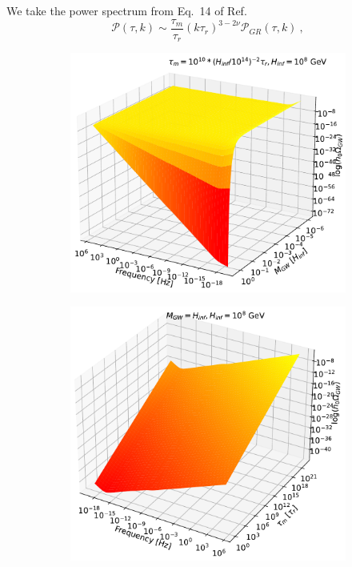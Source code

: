 \documentclass[prd,twocolumn,aps,psfig,nofootinbib,nobibnotes,superscriptaddress,preprintnumbers,times]{revtex4-2}
\begin{document}
We take the power spectrum from Eq.\ 14 of Ref.\ \cite{Fujita:2018}
\begin{equation}\label{eqn:20}
    \mathcal{P}(\tau, k) \sim \frac{\tau_m}{\tau_r}(k\tau_r)^{3-2\nu}\mathcal{P}_{GR}(\tau,k)\ , 
\end{equation}
\begin{figure}[H]
\begin{subfigure}{.5\textwidth}
  \centering
  \includegraphics[width=.82\linewidth]{fig/fig4a.pdf}  
  \label{fig:contour-a}
\end{subfigure}
\begin{subfigure}{.5\textwidth}
  \centering
  \includegraphics[width=.82\linewidth]{fig/fig4b.pdf}  
  \label{fig:contour-b}
\end{subfigure}

\end{figure}
\end{document}
